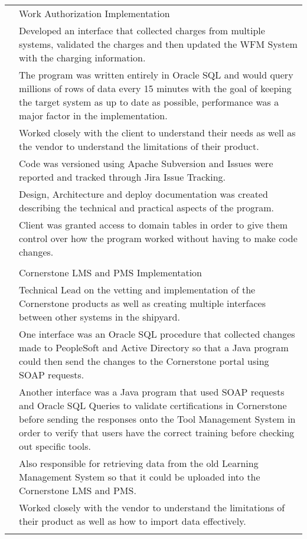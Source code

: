 \documentclass[12pt]{article}
\begin{document}
\begin{tabular}{p{2.7cm}|p{15.0cm}}
	\centering 2018 & Work Authorization Implementation\\&\small{Developed an interface that collected charges from multiple systems, validated the charges and then updated the WFM System with the charging information.}\\&\small{The program was written entirely in Oracle SQL and would query millions of rows of data every 15 minutes with the goal of keeping the target system as up to date as possible, performance was a major factor in the implementation.}\\&\small{Worked closely with the client to understand their needs as well as the vendor to understand the limitations of their product.}\\&\small{Code was versioned using Apache Subversion and Issues were reported and tracked through Jira Issue Tracking.}\\&\small{Design, Architecture and deploy documentation was created describing the technical and practical aspects of the program.}\\&\small{Client was granted access to domain tables in order to give them control over how the program worked without having to make code changes.}\\\multicolumn{2}{c}{} \\
	\centering 2017 & Cornerstone LMS and PMS Implementation\\&\small{Technical Lead on the vetting and implementation of the Cornerstone products as well as creating multiple interfaces between other systems in the shipyard.}\\&\small{One interface was an Oracle SQL procedure that collected changes made to PeopleSoft and Active Directory so that a Java program could then send the changes to the Cornerstone portal using SOAP requests.}\\&\small{Another interface was a Java program that used SOAP requests and Oracle SQL Queries to validate certifications in Cornerstone before sending the responses onto the Tool Management System in order to verify that users have the correct training before checking out specific tools.}\\&\small{Also responsible for retrieving data from the old Learning Management System so that it could be uploaded into the Cornerstone LMS and PMS.}\\&\small{Worked closely with the vendor to understand the limitations of their product as well as how to import data effectively.}\\\multicolumn{2}{c}{} \\

\end{tabular}
\end{document}
